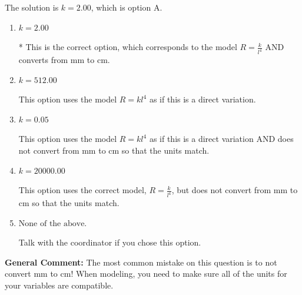 \documentclass{extbook}[14pt]
\begin{document}
\begin{enumerate}
{The solution is \( k = 2.00 \), which is option A.\begin{enumerate}[label=\Alph*.]
\item \( k = 2.00 \)

* This is the correct option, which corresponds to the model $R = \frac{k}{l^{4}}$ AND converts from mm to cm.
\item \( k = 512.00 \)

This option uses the model $R = kl^{4}$ as if this is a direct variation.
\item \( k = 0.05 \)

This option uses the model $R = kl^{4}$ as if this is a direct variation AND does not convert from mm to cm so that the units match.
\item \( k = 20000.00 \)

This option uses the correct model, $R = \frac{k}{l^{4}}$, but does not convert from mm to cm so that the units match.
\item \( \text{None of the above.} \)

Talk with the coordinator if you chose this option.
\end{enumerate}

\textbf{General Comment:} The most common mistake on this question is to not convert mm to cm! When modeling, you need to make sure all of the units for your variables are compatible.
}
\end{enumerate}
\end{document}
